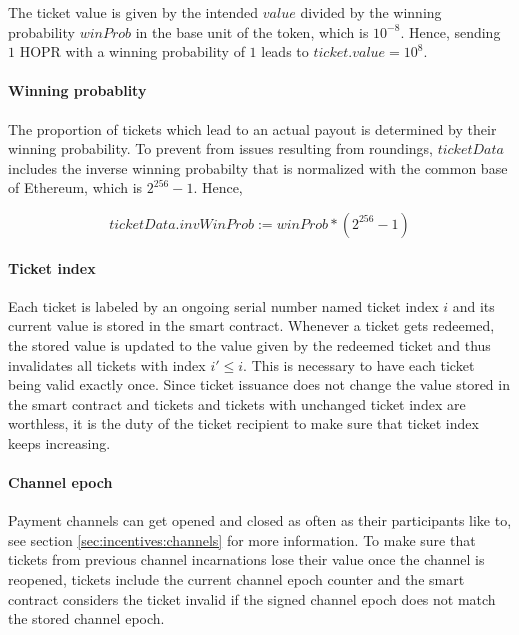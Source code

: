 The ticket value is given by the intended $value$ divided by the winning probability $winProb$ in the base unit of the token, which is $10^{-8}$. Hence, sending $1$ HOPR with a winning probability of $1$ leads to $ticket.value = 10^8$.

\paragraph{Winning probablity}
\label{sec:tickets:issuance:winningprobability}

The proportion of tickets which lead to an actual payout is determined by their winning probability. To prevent from issues resulting from roundings, $ticketData$ includes the inverse winning probabilty that is normalized with the common base of Ethereum, which is $2^{256} - 1$. Hence,

$$ ticketData.invWinProb := winProb * (2^{256} -1)$$

\paragraph{Ticket index}
\label{sec:tickets:issuance:ticketindex}

Each ticket is labeled by an ongoing serial number named ticket index $i$ and its current value is stored in the smart contract. Whenever a ticket gets redeemed, the stored value is updated to the value given by the redeemed ticket and thus invalidates all tickets with index $i' \le i$. This is necessary to have each ticket being valid exactly once. Since ticket issuance does not change the value stored in the smart contract and tickets and tickets with unchanged ticket index are worthless, it is the duty of the ticket recipient to make sure that ticket index keeps increasing.

\paragraph{Channel epoch}
\label{sec:tickets:issuance:channelepoch}

Payment channels can get opened and closed as often as their participants like to, see section \ref{sec:incentives:channels} for more information. To make sure that tickets from previous channel incarnations lose their value once the channel is reopened, tickets include the current channel epoch counter and the smart contract considers the ticket invalid if the signed channel epoch does not match the stored channel epoch.